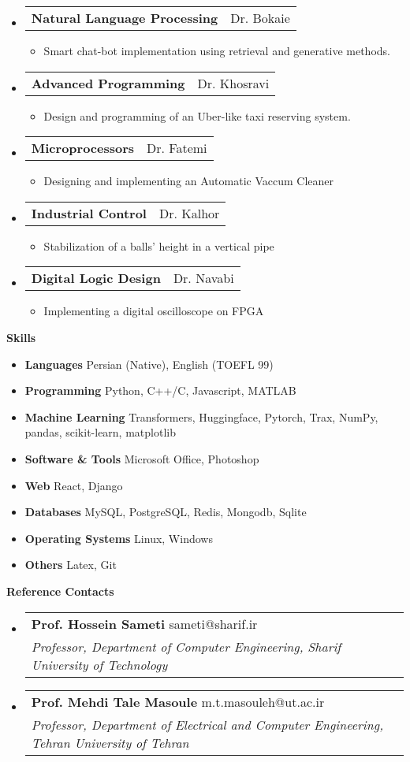 \documentclass[letterpaper,12pt]{article}
\makeatletter
\def \entryspacing {-0pt}
\renewcommand{\section}[2]{\vspace{5pt}
	\colorbox{secondary}{\color{white}\raggedbottom\normalsize\textbf{{#1}{\hspace{7pt}#2}}}
}
\newcommand{\resumeEntryStart}{\begin{itemize}[leftmargin=2.5mm]}
\newcommand{\resumeEntryEnd}{\end{itemize}\vspace{\entryspacing}}
\newcommand{\resumeItemListStart}{\begin{itemize}[leftmargin=4.5mm]}
\newcommand{\resumeItemListEnd}{\end{itemize}}
\newcommand{\resumeItem}[1]{
	\item\small{
		{#1 \vspace{-2pt}}
	}
}
\newcommand{\resumeEntryTD}[2]{
	\vspace{-1pt}\item[]
	\begin{tabularx}{0.97\textwidth}{X@{\hspace{60pt}}r}
		\textbf{\color{primary}#1} & {\firabook\color{accent}\small#2} \\
	\end{tabularx}\vspace{-6pt}
}
\newcommand{\resumeEntryS}[2]{
	\item[]\small{
		\textbf{\color{primary}#1 }{ #2 \vspace{-6pt}}
	}
}
\newcommand{\resumeEntryTSDLP}[5]{
	\vspace{-1pt}\item[]
	\begin{tabularx}{0.97\textwidth}{X@{\hspace{60pt}}r}
		\textbf{\color{primary}#1}{ #2 \vspace{-6pt}} & {\firabook\color{accent}\small#3} \\
		\textit{\color{accent}\small#4} & \textit{\color{accent}\small#5} \\
	\end{tabularx}\vspace{-6pt}
}
\makeatother
\begin{document}
	\resumeEntryStart
	\resumeEntryTD
	{Natural Language Processing}{Dr. Bokaie}
	\resumeItemListStart
	\resumeItem {Smart chat-bot implementation using retrieval and generative methods.}
	\resumeItemListEnd
	\resumeEntryEnd
	
	\resumeEntryStart
	\resumeEntryTD
	{Advanced Programming}{Dr. Khosravi}
	\resumeItemListStart
	\resumeItem {Design and programming of an Uber-like taxi reserving system.}
	\resumeItemListEnd
	\resumeEntryEnd
	
	\resumeEntryStart
	\resumeEntryTD
	{Microprocessors}{Dr. Fatemi}
	\resumeItemListStart
	\resumeItem {Designing and implementing an Automatic Vaccum Cleaner}
	\resumeItemListEnd
	\resumeEntryEnd
	
	\resumeEntryStart
	\resumeEntryTD
	{Industrial Control}{Dr. Kalhor}
	\resumeItemListStart
	\resumeItem {Stabilization of a balls’ height in a vertical pipe}
	\resumeItemListEnd
	\resumeEntryEnd

	\resumeEntryStart
	\resumeEntryTD
	{Digital Logic Design}{Dr. Navabi}
	\resumeItemListStart
	\resumeItem {Implementing a digital oscilloscope on FPGA}
	\resumeItemListEnd
	\resumeEntryEnd	
	\section{\faGears}{Skills}
	\resumeEntryStart
	\resumeEntryS{Languages } {Persian (Native), English (TOEFL 99)}
	\resumeEntryS{Programming } {Python, C++/C, Javascript, MATLAB}
	\resumeEntryS{Machine Learning } {Transformers, Huggingface, Pytorch, Trax, NumPy, pandas, scikit-learn, matplotlib}
	\resumeEntryS{Software \& Tools } {Microsoft Office, Photoshop}
	\resumeEntryS{Web } {React, Django}
	\resumeEntryS{Databases } {MySQL, PostgreSQL, Redis, Mongodb, Sqlite}
	\resumeEntryS{Operating Systems } {Linux, Windows}
	\resumeEntryS{Others } {Latex, Git}
	\resumeEntryEnd
	
	
	\section{\faArrowCircleUp}{Reference Contacts}
	\resumeEntryStart
	\resumeEntryTSDLP{\faEnvelope \space \space \space Prof. Hossein Sameti} {sameti@sharif.ir}{}{Professor, Department of Computer Engineering, Sharif University of Technology}{}
	\resumeEntryTSDLP{\faEnvelope \space \space \space Prof. Mehdi Tale Masoule} {m.t.masouleh@ut.ac.ir}{}{Professor, Department of Electrical and Computer Engineering, Tehran University of Tehran}{}
	\resumeEntryEnd
	
\end{document}
